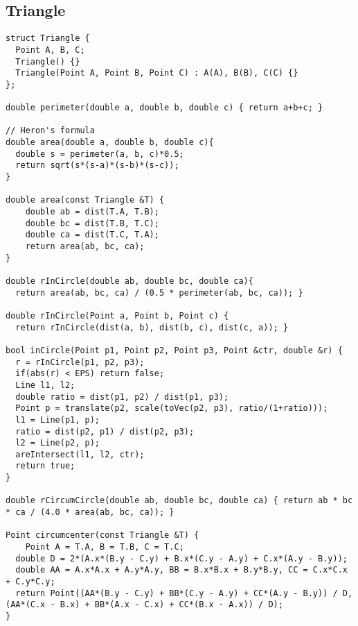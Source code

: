 \documentclass[11pt, oneside]{article}
\begin{document}
\subsection{Triangle}
\begin{lstlisting}
struct Triangle {
  Point A, B, C;
  Triangle() {}
  Triangle(Point A, Point B, Point C) : A(A), B(B), C(C) {}
};

double perimeter(double a, double b, double c) { return a+b+c; }

// Heron's formula
double area(double a, double b, double c){
  double s = perimeter(a, b, c)*0.5;
  return sqrt(s*(s-a)*(s-b)*(s-c));
}

double area(const Triangle &T) {
    double ab = dist(T.A, T.B);
    double bc = dist(T.B, T.C);
    double ca = dist(T.C, T.A);
    return area(ab, bc, ca);
}

double rInCircle(double ab, double bc, double ca){
  return area(ab, bc, ca) / (0.5 * perimeter(ab, bc, ca)); }

double rInCircle(Point a, Point b, Point c) {
  return rInCircle(dist(a, b), dist(b, c), dist(c, a)); }

bool inCircle(Point p1, Point p2, Point p3, Point &ctr, double &r) {
  r = rInCircle(p1, p2, p3);
  if(abs(r) < EPS) return false;
  Line l1, l2;
  double ratio = dist(p1, p2) / dist(p1, p3);
  Point p = translate(p2, scale(toVec(p2, p3), ratio/(1+ratio)));
  l1 = Line(p1, p);
  ratio = dist(p2, p1) / dist(p2, p3);
  l2 = Line(p2, p);
  areIntersect(l1, l2, ctr);
  return true;
}

double rCircumCircle(double ab, double bc, double ca) { return ab * bc * ca / (4.0 * area(ab, bc, ca)); }

Point circumcenter(const Triangle &T) {
    Point A = T.A, B = T.B, C = T.C;
  double D = 2*(A.x*(B.y - C.y) + B.x*(C.y - A.y) + C.x*(A.y - B.y));
  double AA = A.x*A.x + A.y*A.y, BB = B.x*B.x + B.y*B.y, CC = C.x*C.x + C.y*C.y;
  return Point((AA*(B.y - C.y) + BB*(C.y - A.y) + CC*(A.y - B.y)) / D, (AA*(C.x - B.x) + BB*(A.x - C.x) + CC*(B.x - A.x)) / D);
}
\end{lstlisting}
\end{document}
